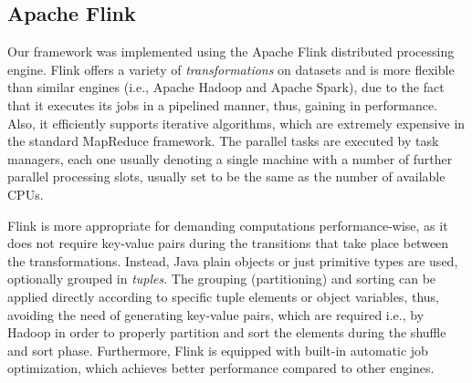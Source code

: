 \subsection{Apache Flink}
\label{subsec:flink_knn}
Our framework was implemented using the Apache Flink distributed processing engine. Flink offers a variety of \textit{transformations} on datasets and is more flexible than similar engines (i.e., Apache Hadoop and Apache Spark), due to the fact that it executes its jobs in a pipelined manner, thus, gaining in performance. Also, it efficiently supports iterative algorithms, which are extremely expensive in the standard MapReduce framework. The parallel tasks are executed by task managers, each one usually denoting a single machine with a number of further parallel processing slots, usually set to be the same as the number of available CPUs. 

Flink is more appropriate for demanding computations performance-wise, as it does not require key-value pairs during the transitions that take place between the transformations. Instead, Java plain objects or just primitive types are used, optionally grouped in \textit{tuples}. The grouping (partitioning) and sorting can be applied directly according to specific tuple elements or object variables, thus, avoiding the need of generating key-value pairs, which are required i.e., by Hadoop in order to properly partition and sort the elements during the shuffle and sort phase. Furthermore, Flink is equipped with built-in automatic job optimization, which achieves better performance compared to other engines.
